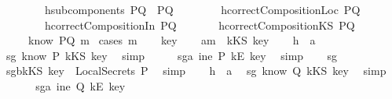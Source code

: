 \begin{isabellebody}
\ \ \ \ \ \ \ \ h{}{\isacharcolon}{\isachardoublequoteopen}subcomponents\ PQ\ {\isacharequal}\ {\isacharbraceleft}P{\isacharcomma}Q{\isacharbraceright}{\isachardoublequoteclose}\isanewline
\ \ \ \ \ \ \ \ h{}{\isacharcolon}{\isachardoublequoteopen}correctCompositionLoc\ PQ{\isachardoublequoteclose}\isanewline
\ \ \ \ \ \ \ \ h{}{\isacharcolon}{\isachardoublequoteopen}correctCompositionIn\ PQ{\isachardoublequoteclose}\isanewline
\ \ \ \ \ \ \ h{}{\isacharcolon}{\isachardoublequoteopen}correctCompositionKS\ PQ{\isachardoublequoteclose}\isanewline
{}\ \ \ \ {\isachardoublequoteopen}{\isasymnot}\ know\ PQ\ m{\isachardoublequoteclose}\isanewline
%
\isadelimproof
%
\endisadelimproof
%
\isatagproof
{}\isamarkupfalse%
\ {\isacharparenleft}cases\ m{\isacharparenright}\isanewline
\ \ \isamarkupfalse%
\ key\isanewline
\ \ \isamarkupfalse%
\ a{}{\isacharcolon}{\isachardoublequoteopen}m\ {\isacharequal}\ kKS\ key{\isachardoublequoteclose}\isanewline
\ \ \isamarkupfalse%
\ h{}\ \ a{}\ \isamarkupfalse%
\ sg{}{\isacharcolon}{\isachardoublequoteopen}{\isasymnot}\ know\ P\ {\isacharparenleft}kKS\ key{\isacharparenright}{\isachardoublequoteclose}\ \isamarkupfalse%
\ simp\isanewline
\ \ \isamarkupfalse%
\ \isamarkupfalse%
\ sg{}a{\isacharcolon}{\isachardoublequoteopen}{\isasymnot}\ ine\ P\ {\isacharparenleft}kE\ key{\isacharparenright}{\isachardoublequoteclose}\ \isamarkupfalse%
\ simp\isanewline
\ \ \isamarkupfalse%
\ sg{}\ \isamarkupfalse%
\ sg{}b{\isacharcolon}{\isachardoublequoteopen}kKS\ key\ {\isasymnotin}\ LocalSecrets\ P{\isachardoublequoteclose}\ \isamarkupfalse%
\ simp\isanewline
\ \ \isamarkupfalse%
\ h{}\ \ a{}\ \isamarkupfalse%
\ sg{}{\isacharcolon}{\isachardoublequoteopen}{\isasymnot}\ know\ Q\ {\isacharparenleft}kKS\ key{\isacharparenright}{\isachardoublequoteclose}\ \isamarkupfalse%
\ simp\isanewline
\ \ \isamarkupfalse%
\ \ \isamarkupfalse%
\ sg{}a{\isacharcolon}{\isachardoublequoteopen}{\isasymnot}\ ine\ Q\ {\isacharparenleft}kE\ key{\isacharparenright}{\isachardoublequoteclose}\ \isamarkupfalse%

\end{isabellebody}
